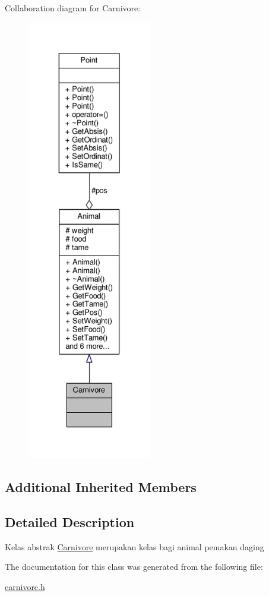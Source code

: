 Collaboration diagram for Carnivore\+:
\nopagebreak
\begin{figure}[H]
\begin{center}
\leavevmode
\includegraphics[height=550pt]{classCarnivore__coll__graph}
\end{center}
\end{figure}
\subsection*{Additional Inherited Members}


\subsection{Detailed Description}
Kelas abstrak \hyperlink{classCarnivore}{Carnivore} merupakan kelas bagi animal pemakan daging 

The documentation for this class was generated from the following file\+:\begin{DoxyCompactItemize}
\item 
\hyperlink{carnivore_8h}{carnivore.\+h}\end{DoxyCompactItemize}

